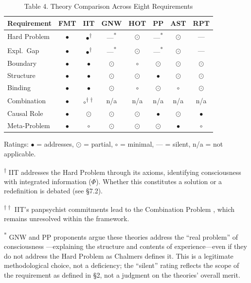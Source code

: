 \documentclass[12pt]{article}
\begin{document}
\begin{table}[htbp]
\centering
\caption{Table 4. Theory Comparison Across Eight Requirements}
\label{tab:comparison}
\small
\renewcommand{\arraystretch}{1.4}
\begin{tabular}{>{\raggedright}p{2cm} c c c c c c c}
\toprule
\textbf{Requirement} & \textbf{FMT} & \textbf{IIT} & \textbf{GNW} & \textbf{HOT} & \textbf{PP} & \textbf{AST} & \textbf{RPT} \\
\midrule
Hard Problem & $\bullet$ & $\bullet$\textsuperscript{$\dagger$} & ---\textsuperscript{*} & $\odot$ & ---\textsuperscript{*} & $\odot$ & --- \\
Expl.\ Gap & $\bullet$ & $\bullet$\textsuperscript{$\dagger$} & ---\textsuperscript{*} & $\odot$ & ---\textsuperscript{*} & $\odot$ & --- \\
Boundary & $\bullet$ & $\bullet$ & $\odot$ & $\circ$ & $\odot$ & $\odot$ & $\odot$ \\
Structure & $\bullet$ & $\bullet$ & $\odot$ & $\odot$ & $\bullet$ & $\odot$ & $\odot$ \\
Binding & $\bullet$ & $\bullet$ & $\odot$ & $\circ$ & $\odot$ & $\circ$ & $\odot$ \\
Combination & $\bullet$ & $\circ$\textsuperscript{$\dagger\dagger$} & n/a & n/a & n/a & n/a & n/a \\
Causal Role & $\bullet$ & $\odot$ & $\odot$ & $\odot$ & $\bullet$ & $\odot$ & $\bullet$ \\
Meta-Problem & $\bullet$ & $\circ$ & $\odot$ & $\odot$ & $\odot$ & $\bullet$ & $\circ$ \\
\bottomrule
\end{tabular}

\vspace{0.5em}
\footnotesize
Ratings: $\bullet$ = addresses, $\odot$ = partial, $\circ$ = minimal, --- = silent, n/a = not applicable.

\textsuperscript{$\dagger$} IIT addresses the Hard Problem through its axioms, identifying consciousness with integrated information ($\Phi$). Whether this constitutes a solution or a redefinition is debated (see \S7.2).

\textsuperscript{$\dagger\dagger$} IIT's panpsychist commitments lead to the Combination Problem \citep{Chalmers2016}, which remains unresolved within the framework.

\textsuperscript{*} GNW and PP proponents argue these theories address the ``real problem'' of consciousness \citep{Seth2021}---\hspace{0pt}explaining the structure and contents of experience---\hspace{0pt}even if they do not address the Hard Problem as Chalmers defines it. This is a legitimate methodological choice, not a deficiency; the ``silent'' rating reflects the scope of the requirement as defined in \S2, not a judgment on the theories' overall merit.
\end{table}
\end{document}
